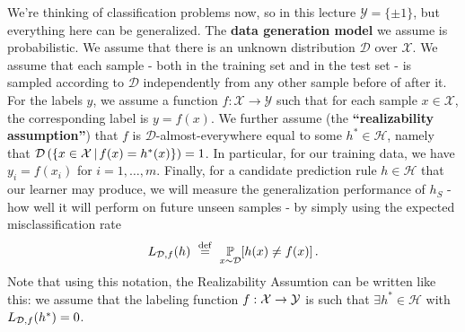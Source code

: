 \documentclass[11pt]{article}
\newcommand{\Dc}{\mathcal{D}}
\newcommand{\Hc}{\mathcal{H}}
\begin{document}
We're thinking of classification problems now, so in this lecture $\mathcal{Y}=\{\pm 1\}$, but everything here can be generalized.
The {\bf data generation model} we assume is probabilistic. 
We assume that there is an unknown distribution $\mathcal{D}$ over
$\mathcal{X}$.
 We assume that each sample - both in the training set and in the test set - is sampled
 according to $\mathcal{D}$ independently from any other sample before of after
 it. For the labels $y$, we assume a function $f:\mathcal{X}\to\mathcal{Y}$ such
 that for each sample $x\in\mathcal{X}$, the corresponding label is $y=f(x)$. We
 further assume (the {\bf ``realizability assumption''}) that $f$ is
 $\Dc$-almost-everywhere equal to some $h^*\in\Hc$, namely that $\Dc\left(
   \left\{ x\in\X\,|\, f(x)=h^*(x)  \right\}
 \right)=1$.
In particular, for our training data, we have $y_i = f(x_i)$ for $i=1,\ldots,m$. 
Finally, for a candidate prediction rule $h\in\Hc$ that our learner may produce,
we will measure the generalization performance of $h_S$ - how well it will perform on future unseen samples - by simply using the expected misclassification rate 
$$
L_{\mathcal{D},f}(h) ~\stackrel{\mathrm{def}}{=}~ \operatorname*{\mathbb{P}}_{x \sim \mathcal{D}}[h(x) \neq f(x)] \,.
$$
Note that using this notation, the Realizability Assumtion can be written like
this: we assume that the labeling function $f:\mathcal{X}\to\mathcal{Y} $ is such that
$\exists h^*\in\Hc$ with $L_{\mathcal{D},f}(h^*)=0$.
\end{document}
